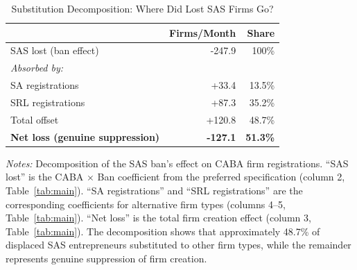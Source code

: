 \begin{table}[htbp]
\centering
\caption{Substitution Decomposition: Where Did Lost SAS Firms Go?}
\label{tab:decomp}
\begin{tabular}{lrr}
\toprule
 & Firms/Month & Share \\
\midrule
SAS lost (ban effect) & -247.9 & 100\% \\
\addlinespace
\textit{Absorbed by:} & & \\
\quad SA registrations & +33.4 & 13.5\% \\
\quad SRL registrations & +87.3 & 35.2\% \\
\addlinespace
Total offset & +120.8 & 48.7\% \\
\textbf{Net loss (genuine suppression)} & \textbf{-127.1} & \textbf{51.3\%} \\
\bottomrule
\end{tabular}
\par\vspace{0.3em}\begin{minipage}{\textwidth}\footnotesize
\textit{Notes:} Decomposition of the SAS ban's effect on CABA firm registrations. ``SAS lost'' is the CABA $\times$ Ban coefficient from the preferred specification (column 2, Table~\ref{tab:main}). ``SA registrations'' and ``SRL registrations'' are the corresponding coefficients for alternative firm types (columns 4--5, Table~\ref{tab:main}). ``Net loss'' is the total firm creation effect (column 3, Table~\ref{tab:main}). The decomposition shows that approximately 48.7\% of displaced SAS entrepreneurs substituted to other firm types, while the remainder represents genuine suppression of firm creation.
\end{minipage}
\end{table}
